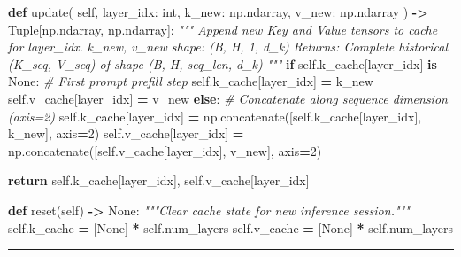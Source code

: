 \documentclass[
  letterpaper,
]{scrbook}
\newenvironment{Shaded}{\begin{snugshade}}{\end{snugshade}}
\newcommand{\BuiltInTok}[1]{#1}
\newcommand{\CommentTok}[1]{\textcolor[rgb]{0.56,0.35,0.01}{\textit{#1}}}
\newcommand{\ControlFlowTok}[1]{\textcolor[rgb]{0.13,0.29,0.53}{\textbf{#1}}}
\newcommand{\DecValTok}[1]{\textcolor[rgb]{0.00,0.00,0.81}{#1}}
\newcommand{\KeywordTok}[1]{\textcolor[rgb]{0.13,0.29,0.53}{\textbf{#1}}}
\newcommand{\NormalTok}[1]{#1}
\newcommand{\OperatorTok}[1]{\textcolor[rgb]{0.81,0.36,0.00}{\textbf{#1}}}
\newcommand{\VariableTok}[1]{\textcolor[rgb]{0.00,0.00,0.00}{#1}}
\begin{document}
\begin{Shaded}
\begin{Highlighting}[]
    \KeywordTok{def}\NormalTok{ update(}
        \VariableTok{self}\NormalTok{,}
\NormalTok{        layer\_idx: }\BuiltInTok{int}\NormalTok{,}
\NormalTok{        k\_new: np.ndarray,}
\NormalTok{        v\_new: np.ndarray}
\NormalTok{    ) }\OperatorTok{{-}\textgreater{}}\NormalTok{ Tuple[np.ndarray, np.ndarray]:}
        \CommentTok{"""}
\CommentTok{        Append new Key and Value tensors to cache for layer\_idx.}
\CommentTok{        k\_new, v\_new shape: (B, H, 1, d\_k)}
\CommentTok{        Returns: Complete historical (K\_seq, V\_seq) of shape (B, H, seq\_len, d\_k)}
\CommentTok{        """}
        \ControlFlowTok{if} \VariableTok{self}\NormalTok{.k\_cache[layer\_idx] }\KeywordTok{is} \VariableTok{None}\NormalTok{:}
            \CommentTok{\# First prompt prefill step}
            \VariableTok{self}\NormalTok{.k\_cache[layer\_idx] }\OperatorTok{=}\NormalTok{ k\_new}
            \VariableTok{self}\NormalTok{.v\_cache[layer\_idx] }\OperatorTok{=}\NormalTok{ v\_new}
        \ControlFlowTok{else}\NormalTok{:}
            \CommentTok{\# Concatenate along sequence dimension (axis=2)}
            \VariableTok{self}\NormalTok{.k\_cache[layer\_idx] }\OperatorTok{=}\NormalTok{ np.concatenate([}\VariableTok{self}\NormalTok{.k\_cache[layer\_idx], k\_new], axis}\OperatorTok{=}\DecValTok{2}\NormalTok{)}
            \VariableTok{self}\NormalTok{.v\_cache[layer\_idx] }\OperatorTok{=}\NormalTok{ np.concatenate([}\VariableTok{self}\NormalTok{.v\_cache[layer\_idx], v\_new], axis}\OperatorTok{=}\DecValTok{2}\NormalTok{)}

        \ControlFlowTok{return} \VariableTok{self}\NormalTok{.k\_cache[layer\_idx], }\VariableTok{self}\NormalTok{.v\_cache[layer\_idx]}

    \KeywordTok{def}\NormalTok{ reset(}\VariableTok{self}\NormalTok{) }\OperatorTok{{-}\textgreater{}} \VariableTok{None}\NormalTok{:}
        \CommentTok{"""Clear cache state for new inference session."""}
        \VariableTok{self}\NormalTok{.k\_cache }\OperatorTok{=}\NormalTok{ [}\VariableTok{None}\NormalTok{] }\OperatorTok{*} \VariableTok{self}\NormalTok{.num\_layers}
        \VariableTok{self}\NormalTok{.v\_cache }\OperatorTok{=}\NormalTok{ [}\VariableTok{None}\NormalTok{] }\OperatorTok{*} \VariableTok{self}\NormalTok{.num\_layers}
\end{Highlighting}
\end{Shaded}

\begin{center}\rule{0.5\linewidth}{0.5pt}\end{center}
\end{document}
